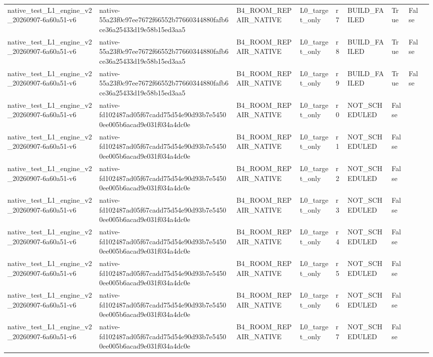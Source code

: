 \begin{tabular}{lllllllll}
native\_test\_L1\_engine\_v2\_20260907-6a60a51-v6 & native-55a23f0c97ee7672f66552b77660344880fafb6ce36a25433d19e58b15ed3aa5 & B4\_ROOM\_REPAIR\_NATIVE & L0\_target\_only & r7 & BUILD\_FAILED & True & False &  \\
native\_test\_L1\_engine\_v2\_20260907-6a60a51-v6 & native-55a23f0c97ee7672f66552b77660344880fafb6ce36a25433d19e58b15ed3aa5 & B4\_ROOM\_REPAIR\_NATIVE & L0\_target\_only & r8 & BUILD\_FAILED & True & False &  \\
native\_test\_L1\_engine\_v2\_20260907-6a60a51-v6 & native-55a23f0c97ee7672f66552b77660344880fafb6ce36a25433d19e58b15ed3aa5 & B4\_ROOM\_REPAIR\_NATIVE & L0\_target\_only & r9 & BUILD\_FAILED & True & False &  \\
native\_test\_L1\_engine\_v2\_20260907-6a60a51-v6 & native-fd102487ad05f67cadd75d54e90d93b7e54500ee005b6acad9e031f034a4dc0e & B4\_ROOM\_REPAIR\_NATIVE & L0\_target\_only & r0 & NOT\_SCHEDULED & False &  &  \\
native\_test\_L1\_engine\_v2\_20260907-6a60a51-v6 & native-fd102487ad05f67cadd75d54e90d93b7e54500ee005b6acad9e031f034a4dc0e & B4\_ROOM\_REPAIR\_NATIVE & L0\_target\_only & r1 & NOT\_SCHEDULED & False &  &  \\
native\_test\_L1\_engine\_v2\_20260907-6a60a51-v6 & native-fd102487ad05f67cadd75d54e90d93b7e54500ee005b6acad9e031f034a4dc0e & B4\_ROOM\_REPAIR\_NATIVE & L0\_target\_only & r2 & NOT\_SCHEDULED & False &  &  \\
native\_test\_L1\_engine\_v2\_20260907-6a60a51-v6 & native-fd102487ad05f67cadd75d54e90d93b7e54500ee005b6acad9e031f034a4dc0e & B4\_ROOM\_REPAIR\_NATIVE & L0\_target\_only & r3 & NOT\_SCHEDULED & False &  &  \\
native\_test\_L1\_engine\_v2\_20260907-6a60a51-v6 & native-fd102487ad05f67cadd75d54e90d93b7e54500ee005b6acad9e031f034a4dc0e & B4\_ROOM\_REPAIR\_NATIVE & L0\_target\_only & r4 & NOT\_SCHEDULED & False &  &  \\
native\_test\_L1\_engine\_v2\_20260907-6a60a51-v6 & native-fd102487ad05f67cadd75d54e90d93b7e54500ee005b6acad9e031f034a4dc0e & B4\_ROOM\_REPAIR\_NATIVE & L0\_target\_only & r5 & NOT\_SCHEDULED & False &  &  \\
native\_test\_L1\_engine\_v2\_20260907-6a60a51-v6 & native-fd102487ad05f67cadd75d54e90d93b7e54500ee005b6acad9e031f034a4dc0e & B4\_ROOM\_REPAIR\_NATIVE & L0\_target\_only & r6 & NOT\_SCHEDULED & False &  &  \\
native\_test\_L1\_engine\_v2\_20260907-6a60a51-v6 & native-fd102487ad05f67cadd75d54e90d93b7e54500ee005b6acad9e031f034a4dc0e & B4\_ROOM\_REPAIR\_NATIVE & L0\_target\_only & r7 & NOT\_SCHEDULED & False &  &  \\

\end{tabular}
